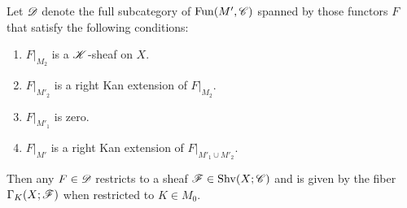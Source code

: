 \documentclass[../../thesis.tex]{subfiles}
\begin{document}
\begin{lemma}
    Let $\mathscr{D}$ denote the full subcategory of $\mathrm{Fun}(M', \mathscr{C})$ spanned by those functors $F$ that satisfy the following conditions:
    \begin{enumerate}
        \item $F|_{M_2}$ is a $\mathscr{K}$-sheaf on $X$.
        \item $F|_{M'_2}$ is a right Kan extension of $F|_{M_2}$.
        \item $F|_{M'_1}$ is zero.
        \item $F|_{M'}$ is a right Kan extension of $F|_{M'_1 \cup M'_2}$.
    \end{enumerate}
    Then any $F\in \mathscr{D}$ restricts to a sheaf $\mathscr{F} \in \mathrm{Shv}(X;\mathscr{C})$ and is given by the fiber $\Gamma_K(X;\mathscr{F})$ when restricted to $K\in M_0$.
\end{lemma}
\end{document}

